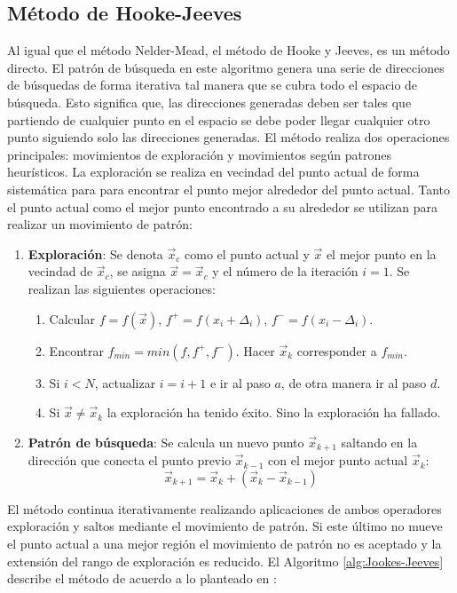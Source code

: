 \subsection{Método de Hooke-Jeeves}
Al igual que el método Nelder-Mead, el método de Hooke y Jeeves, es un método directo.  El patrón de búsqueda en este algoritmo genera una serie de direcciones de búsquedas de forma iterativa tal manera que se cubra todo el espacio de búsqueda. Esto significa que, las direcciones generadas deben ser tales que partiendo de cualquier punto en el espacio se debe poder llegar cualquier otro punto siguiendo solo las direcciones generadas. El método realiza dos operaciones principales: movimientos de exploración y movimientos según patrones heurísticos. La exploración se realiza en vecindad del punto actual de forma sistemática para para encontrar el punto mejor alrededor del punto actual. Tanto el punto actual como el mejor punto encontrado a su alrededor se utilizan para realizar un movimiento de patrón:
\begin{enumerate}
\item \textbf{Exploración}: Se denota $\vec{x}_c$ como el punto actual y $\vec{x}$ el mejor punto en la vecindad de $\vec{x}_c$, se asigna $\vec{x}=\vec{x}_c$ y el número de la iteración $i=1$. Se realizan las siguientes operaciones:
\begin{enumerate}
\item Calcular $f=f(\vec{x})$, $f^+=f(x_i+ \Delta_i)$, $f^-=f(x_i- \Delta_i)$.
\item Encontrar $f_{min}= min(f,f^+,f^-)$. Hacer $\vec{x}_k$ corresponder a $f_{min}$.
\item Si $i<N$, actualizar $i=i+1$ e ir al paso $a$, de otra manera ir al paso $d$. 
\item Si $\vec{x} \neq \vec{x}_k$ la exploración ha tenido éxito. Sino la exploración ha fallado. \\ 
\end{enumerate}

\item \textbf{Patrón de búsqueda}: Se calcula un nuevo punto $\vec{x}_{k+1}$ saltando en la dirección que conecta el punto previo $\vec{x}_{k-1}$ con el mejor punto actual $\vec{x}_k$:
\begin{equation}
\vec{x}_{k+1}=\vec{x}_{k}+(\vec{x}_{k}-\vec{x}_{k-1})
\end{equation}
\end{enumerate}
El método continua iterativamente realizando aplicaciones de ambos operadores exploración y saltos mediante el movimiento de patrón. Si este último no mueve el punto actual a una mejor región el movimiento de patrón no es aceptado y la extensión del rango de exploración es reducido. El Algoritmo \ref{alg:Jookes-Jeeves} describe el método de acuerdo a lo planteado en \cite{deb_optimization_2004}:
